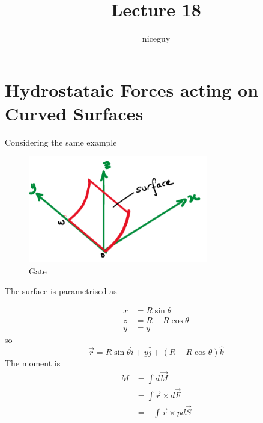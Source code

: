 \documentclass[12pt]{article}
\author{niceguy}
\title{Lecture 18}
\begin{document}
\maketitle

\section{Hydrostataic Forces acting on Curved Surfaces}

Considering the same example

\begin{ex}

\begin{figure}
	\centering
	\caption{Gate}
	\label{gate}
	\includegraphics[width=0.7\textwidth]{gate.png}
\end{figure}

The surface is parametrised as

\begin{align*}
	x &= R\sin\theta \\
	z &= R - R\cos\theta \\
	y &= y
\end{align*}
so
$$\vec{r} = R\sin\theta\hat{i} + y\hat{j} + (R-R\cos\theta)\hat{k}$$
The moment is
\begin{align*}
	M &= \int d\vec{M} \\
	  &= \int \vec{r} \times d\vec{F} \\
	  &= -\int \vec{r} \times pd\vec{S}
\end{align*}


\end{ex}
\end{document}
